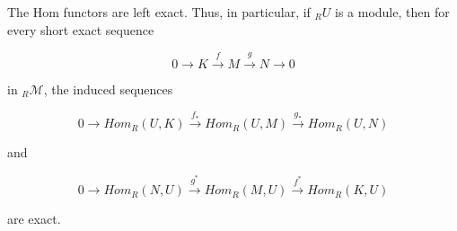 The Hom functors are left exact. Thus, in particular, if ${}_R U$ is a module, then for every short exact sequence

$$0 \to K \xrightarrow{f} M \xrightarrow{g} N \to 0$$

in ${}_R\mathcal{M}$, the induced sequences

$$0 \to Hom_R(U, K) \xrightarrow{f_*} Hom_R(U, M) \xrightarrow{g_*} Hom_R(U, N)$$

and

$$0 \to Hom_R(N, U) \xrightarrow{g^*} Hom_R(M, U) \xrightarrow{f^*} Hom_R(K, U)$$

are exact.
